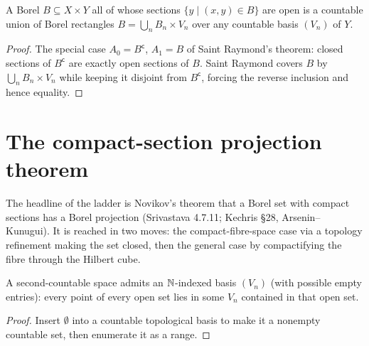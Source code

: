 \begin{theorem}\label{thm:dst-kunugui-novikov}
  \leanok
  A Borel \(B\subseteq X\times Y\) all of whose sections \(\{y\mid(x,y)\in B\}\) are open is a
  countable union of Borel rectangles \(B=\bigcup_n B_n\times V_n\) over any countable basis
  \((V_n)\) of \(Y\).
\end{theorem}
\begin{proof}\leanok
  The special case \(A_0=B^{\mathsf c}\), \(A_1=B\) of Saint Raymond's theorem: closed sections of
  \(B^{\mathsf c}\) are exactly open sections of \(B\). Saint Raymond covers \(B\) by
  \(\bigcup_n B_n\times V_n\) while keeping it disjoint from \(B^{\mathsf c}\), forcing the reverse
  inclusion and hence equality.
\end{proof}

\section{The compact-section projection theorem}

The headline of the ladder is Novikov's theorem that a Borel set with compact sections has a Borel
projection (Srivastava 4.7.11; Kechris \S28, Arsenin--Kunugui). It is reached in two moves: the
compact-fibre-space case via a topology refinement making the set closed, then the general case by
compactifying the fibre through the Hilbert cube.

\begin{lemma}\label{thm:dst-nat-basis}
  \leanok
  A second-countable space admits an \(\mathbb{N}\)-indexed basis \((V_n)\) (with possible empty entries):
  every point of every open set lies in some \(V_n\) contained in that open set.
\end{lemma}
\begin{proof}\leanok
  Insert \(\emptyset\) into a countable topological basis to make it a nonempty countable set, then
  enumerate it as a range.
\end{proof}

